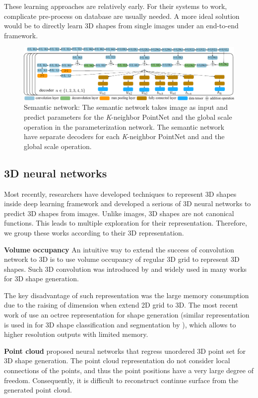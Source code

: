 These learning approaches are relatively early. For their systems to work, complicate pre-process on database are usually needed. A more ideal solution would be to directly learn 3D shapes
from single images under an end-to-end framework. 

\begin{figure}[htbp]
	\centering
	\includegraphics[width=\linewidth]{img/net/semnet}
	\caption{Semantic network: The semantic network takes image as input and predict parameters for the \textit{K}-neighbor PointNet and the global scale operation in the parameterization network. The semantic network have separate decoders for each \textit{K}-neighbor PointNet and and the global scale operation.}
	\label{fig:semnet}
\end{figure}

\subsection{3D neural networks}
Most recently, researchers have developed techniques to represent 3D shapes inside deep learning framework and developed a serious of 3D neural networks to predict 3D shapes from images. Unlike images, 3D shapes are not canonical functions. This leads to multiple exploration for their representation. Therefore, we group these works according to their 3D representation.

\noindent\textbf{Volume occupancy}
An intuitive way to extend the success of convolution network to 3D is to use volume occupancy of regular 3D grid to represent 3D shapes. Such 3D convolution was introduced by \cite{3dshapenet} and widely used in many works \cite{3DR2N2,learnobj} for 3D shape generation.

The key disadvantage of such representation was the large memory consumption due to the raising of dimension when extend 2D grid to 3D. The most recent work of \cite{octreegen} use
an octree representation for shape generation (similar representation is used in for 3D shape classification and segmentation by \cite{ocnn}), which allows to higher resolution outputs
with limited memory.

\noindent\textbf{Point cloud}
\cite{PSGN} proposed neural networks that regress unordered
3D point set for 3D shape generation. The point cloud representation
do not consider local connections of the points, and thus the point positions have
a very large degree of freedom. Consequently, it is difficult to reconstruct continue surface from the generated point cloud.

